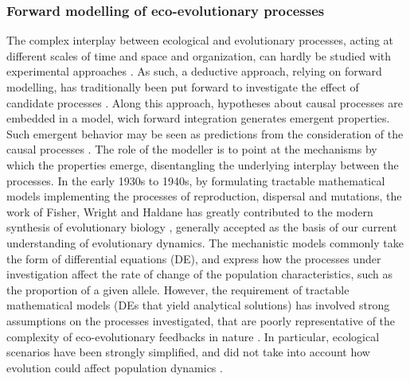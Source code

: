 \subsubsection*{Forward modelling of eco-evolutionary processes}

The complex interplay between ecological and evolutionary processes, acting at different scales of time and space and organization, can hardly be studied with experimental approaches \cite{Pontarp2019,Hagen2022}. 
As such, a deductive approach, relying on forward modelling, has traditionally been put forward to investigate the effect of candidate processes \cite{Brummitt2020}. Along this approach, hypotheses about causal processes are embedded in a model, wich forward integration generates emergent properties. Such emergent behavior may be seen as predictions from the consideration of the causal processes \cite{May2004}. The role of the modeller is to point at the mechanisms by which the properties emerge, disentangling the underlying interplay between the processes. %
% 
In the early 1930s to 1940s, by formulating tractable mathematical models implementing the processes of reproduction, dispersal and mutations, the work of Fisher, Wright and Haldane has greatly contributed to the modern synthesis of evolutionary biology \cite{huxley1942evolution}, generally accepted as the basis of our current understanding of evolutionary dynamics. 
% 
The mechanistic models commonly take the form of differential equations (DE), and express how the processes under investigation affect the rate of change of the population characteristics, such as the proportion of a given allele. 
% 
However, the requirement of tractable mathematical models (DEs that yield analytical solutions) has involved strong assumptions on the processes investigated, that are poorly representative of the complexity of eco-evolutionary feedbacks in nature \cite{Govaert2019a}. In particular, ecological scenarios have been strongly simplified, and did not take into account how evolution could affect population dynamics \cite{Lion2022}.

